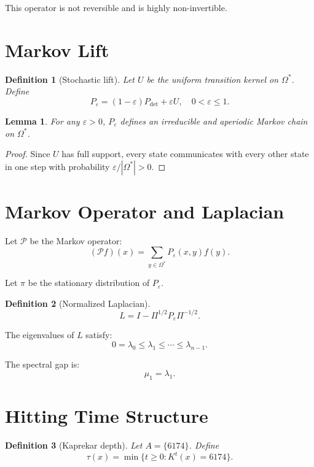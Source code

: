 \documentclass[11pt]{article}
\newtheorem{definition}{Definition}
\newtheorem{lemma}{Lemma}
\begin{document}
This operator is not reversible and is highly non-invertible.

\section{Markov Lift}

\begin{definition}[Stochastic lift]
Let $U$ be the uniform transition kernel on $\Omega^*$. Define
\[
P_\varepsilon = (1-\varepsilon)P_{\mathrm{det}} + \varepsilon U,
\quad 0 < \varepsilon \le 1.
\]
\end{definition}

\begin{lemma}
For any $\varepsilon > 0$, $P_\varepsilon$ defines an irreducible and aperiodic Markov chain on $\Omega^*$.
\end{lemma}

\begin{proof}
Since $U$ has full support, every state communicates with every other state in one step with probability $\varepsilon / |\Omega^*| > 0$.
\end{proof}

\section{Markov Operator and Laplacian}

Let $\mathcal{P}$ be the Markov operator:
\[
(\mathcal{P} f)(x) = \sum_{y \in \Omega^*} P_\varepsilon(x,y) f(y).
\]

Let $\pi$ be the stationary distribution of $P_\varepsilon$.

\begin{definition}[Normalized Laplacian]
\[
L = I - \Pi^{1/2} P_\varepsilon \Pi^{-1/2}.
\]
\end{definition}

The eigenvalues of $L$ satisfy:
\[
0 = \lambda_0 \le \lambda_1 \le \cdots \le \lambda_{n-1}.
\]

The spectral gap is:
\[
\mu_1 = \lambda_1.
\]

\section{Hitting Time Structure}

\begin{definition}[Kaprekar depth]
Let $A = \{6174\}$. Define
\[
\tau(x) = \min \{t \ge 0 : K^t(x) = 6174\}.
\]
\end{definition}
\end{document}
